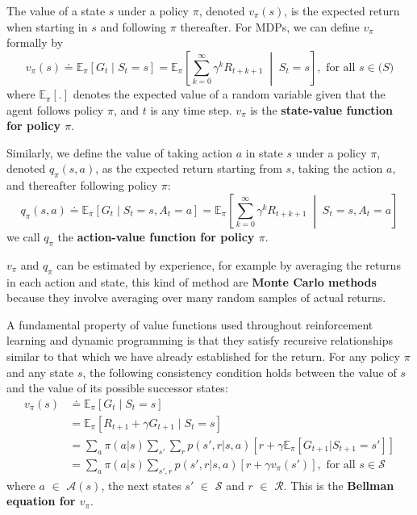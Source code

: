 \documentclass[11pt]{article}
\begin{document}
The value of a state \(s\) under a policy \(\pi\), denoted \(v_{\pi}(s)\), is the
expected return when starting in \(s\) and following \(\pi\) thereafter. For MDPs,
we can define \(v_{\pi}\) formally by
\begin{equation}
v_{\pi}(s) \doteq \mathbb{E}_{\pi}[G_{t} \mid S_{t}=s] =
\mathbb{E}_{\pi} \left[ \sum\limits_{k=0}^{\infty} \gamma^{k}R_{t+k+1} \;\middle|\; S_{t}=s \right], \text{ for all } s \in \mathcal(S)
\end{equation}
where \(\mathbb{E}_{\pi}[{.}]\) denotes the expected value of a random variable
given that the agent follows policy \(\pi\), and \(t\) is any time step. \(v_\pi\) is
the \textbf{state-value function for policy \(\pi\)}.

Similarly, we define the value of taking action \(a\) in state \(s\) under a policy
\(\pi\), denoted \(q_{\pi}(s, a)\), as the expected return starting from \(s\), taking
the action \(a\), and thereafter following policy \(\pi\):
\begin{equation}
q_{\pi}(s,a) \doteq \mathbb{E}_{\pi}[G_{t} \mid S_{t}=s, A_{t}=a] =
\mathbb{E}_{\pi} \left[ \sum\limits_{k=0}^{\infty} \gamma^{k}R_{t+k+1} \;\middle|\; S_{t}=s, A_{t}=a \right]
\end{equation}
we call \(q_\pi\) the \textbf{action-value function for policy \(\pi\)}.

\(v_\pi\) and \(q_\pi\) can be estimated by experience, for example by averaging the
returns in each action and state, this kind of method are \textbf{Monte Carlo methods}
because they involve averaging over many random samples of actual returns.

A fundamental property of value functions used throughout reinforcement learning
and dynamic programming is that they satisfy recursive relationships similar to
that which we have already established for the return. For any policy \(\pi\) and
any state \(s\), the following consistency condition holds between the value of
\(s\) and the value of its possible successor states:
\begin{equation}
\begin{aligned}
v_{\pi}(s) &\doteq \mathbb{E}_{\pi}[G_{t} \mid S_{t}=s] \\
           &= \mathbb{E}_{\pi}[R_{t+1} + \gamma G_{t+1} \mid S_{t}=s] \\
           &= \sum\limits_{a} \pi(a|s) \sum\limits_{s'} \sum\limits_{r}
           p(s', r | s, a) \left[ r + \gamma \mathbb{E}_{\pi}[G_{t+1}|S_{t+1}=s'] \right]\\
           &= \sum\limits_{a} \pi(a|s) \sum\limits_{s',r}
           p(s', r | s, a) \left[ r + \gamma v_{\pi}(s') \right], \text{ for all } s \in \mathcal{S}
\end{aligned}
\end{equation}
where \(a\) \(\in\) \(\mathcal{A}(s)\), the next states \(s'\) \(\in\) \(\mathcal{S}\) and
\(r\) \(\in\) \(\mathcal{R}\). This is the \textbf{Bellman equation for \(v_\pi\)}.
\end{document}
